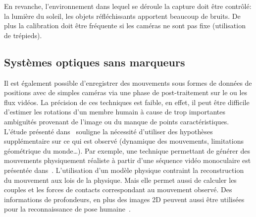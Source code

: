 En revanche, l'environnement dans lequel
se déroule la capture doit être contr\^olé: la lumière du soleil, les objets réfléchissants
apportent beaucoup de bruits. De plus la calibration doit être fréquente si les caméras ne sont pas 
fixe (utilisation de trépieds).

\subsection{Systèmes optiques sans marqueurs}
Il est également possible d'enregistrer des mouvements 
sous formes de données de positions avec de simples caméras via une phase
de post-traitement sur le ou les flux vidéos.
La précision de ces techniques est faible, en effet,
il peut être difficile d'estimer les rotations d'un membre humain à cause de
trop importantes ambiguïtés provenant de l'image ou du manque de points caractéristiques.
L'étude présenté dans~\cite{gleicher02} souligne la nécessité d'utiliser des hypothèses
supplémentaire sur ce qui est observé (dynamique des mouvements, limitations géométrique du monde\ldots).
Par exemple, une technique permettant
de générer des mouvements physiquement réaliste à partir d'une séquence 
vidéo monoculaire est présentée dans~\cite{wei10}. L'utilisation
d'un modèle physique contraint la reconstruction
du mouvement aux lois de la physique.
Mais elle permet aussi de calculer
les couples et les forces de contacts correspondant au mouvement observé.
Des informations de profondeurs, en plus des images 2D peuvent
aussi être utilisées pour la reconnaissance de pose humaine~\cite{shotton11}.

